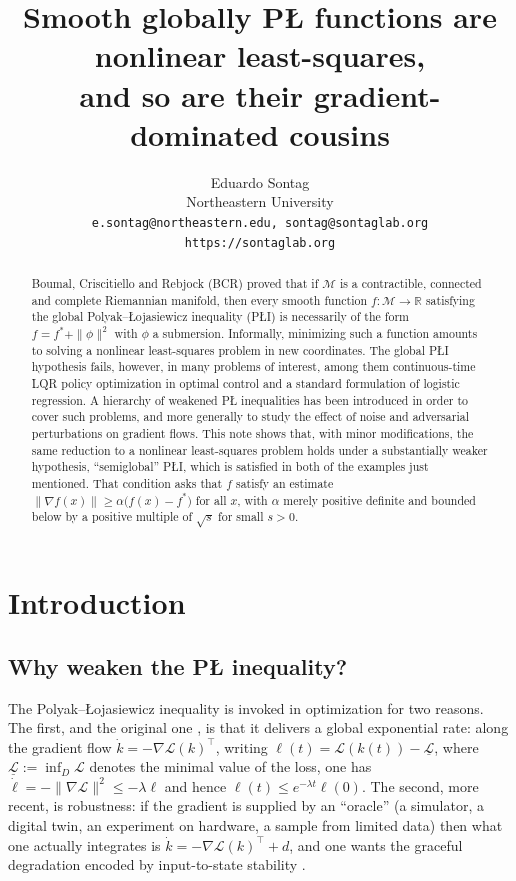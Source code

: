 \documentclass[11pt]{article}
\title{Smooth globally P\L{} functions are nonlinear least-squares,\\
and so are their gradient-dominated cousins}
\author{Eduardo Sontag\\
  Northeastern University\\
  \mbox{\tt e.sontag@northeastern.edu, sontag@sontaglab.org}\\
  \mbox{\tt https://sontaglab.org}}
\date{}
\theoremstyle{plain}
\theoremstyle{definition}
\theoremstyle{remark}
\newcommand{\M}{\mathcal{M}}
\newcommand{\R}{\mathbb{R}}
\begin{document}
\maketitle

\begin{abstract}
  \noindent
Boumal, Criscitiello and Rebjock (BCR) proved that if $\M$ is a
contractible, connected and complete Riemannian manifold, then every
smooth function $f\colon\M\to\R$ satisfying the global
Polyak--\L{}ojasiewicz inequality (P\L{}I) is necessarily of the form
$f = f^* + \|\phi\|^2$ with $\phi$ a submersion.  Informally,
minimizing such a function amounts to solving a nonlinear
least-squares problem in new coordinates.  The global P\L{}I
hypothesis fails, however, in many problems of interest, among them
continuous-time LQR policy optimization in optimal control and a
standard formulation of logistic regression.  A hierarchy of weakened
P\L{} inequalities has been introduced in order to cover such
problems, and more generally to study the effect of noise and
adversarial perturbations on gradient flows.  This note shows that,
with minor modifications, the same reduction to a nonlinear
least-squares problem holds under a substantially weaker hypothesis,
``semiglobal'' P\L{}I, which is satisfied in both of the examples just
mentioned.  That condition asks that $f$ satisfy an estimate
$\|\nabla f(x)\| \ge \alpha\bigl(f(x)-f^*\bigr)$ for all $x$, with
$\alpha$ merely positive definite and bounded below by a positive
multiple of $\sqrt{s}$ for small $s>0$.

\end{abstract}

\tableofcontents

\section{Introduction}

\subsection{Why weaken the P\L{} inequality?}
\label{sec:why}

The Polyak--\L{}ojasiewicz inequality is invoked in optimization for two
reasons. The first, and the original one \cite{Polyak1963}, is that it delivers a
global exponential rate: along the gradient flow
$\dot k = -\nabla\mathcal{L}(k)^\top$, writing
$\ell(t) = \mathcal{L}(k(t)) - \underline{\mathcal{L}}$, where
$\underline{\mathcal{L}} := \inf_{D}\mathcal{L}$ denotes the minimal value of the
loss, one has
$\dot\ell = -\|\nabla\mathcal{L}\|^2 \le -\lambda\ell$ and hence
$\ell(t)\le e^{-\lambda t}\ell(0)$. The second, more recent, is robustness: if
the gradient is supplied by an ``oracle'' (a simulator, a digital twin, an
experiment on hardware, a sample from limited data) then what one actually
integrates is $\dot k = -\nabla\mathcal{L}(k)^\top + d$, and one wants the
graceful degradation encoded by input-to-state stability
\cite{Sontag2022, CuiJiangSontag2024, Sontag2007}.
\end{document}
